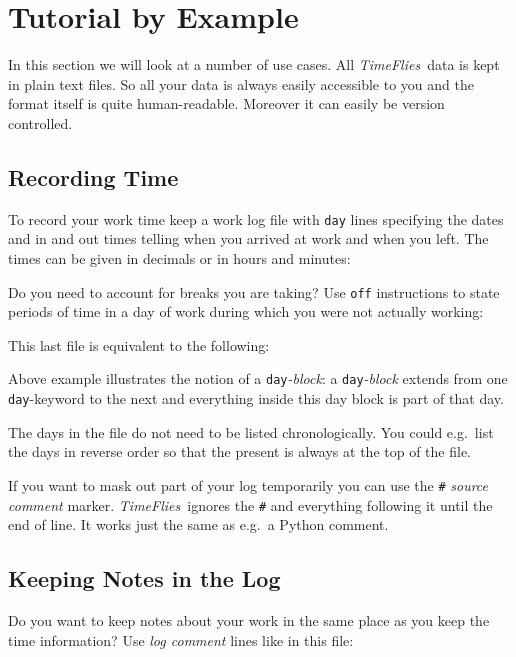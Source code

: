 \documentclass[11pt]{article}
\newcommand{\timeflies}{\emph{TimeFlies}}
\begin{document}
\section{Tutorial by Example}

In this section we will look at a number of use cases. All \timeflies\ data is kept in plain text files. So all your data is always easily accessible to you and the format itself is quite human-readable. Moreover it can easily be version controlled.

\subsection{Recording Time}

To record your work time keep a work log file with \verb-day- lines specifying the dates and in and out times telling when you arrived at work and when you left. The times can be given in decimals or in hours and minutes:



Do you need to account for breaks you are taking? Use \verb-off- instructions to state periods of time in a day of work during which you were not actually working:



This last file is equivalent to the following:



Above example illustrates the notion of a \verb-day-\emph{-block}: a \verb-day-\emph{-block} extends
from one \verb-day--keyword to the next and everything inside this day block is part of that day.

The days in the file do not need to be listed chronologically. You could e.g.\ list the days in reverse order so that the present is always at the top of the file.

If you want to mask out part of your log temporarily you can use the \verb-#- \emph{source comment} marker. \timeflies\ ignores the \verb-#- and everything following it until the end of line. It works just the same as e.g.\ a Python comment.



\subsection{Keeping Notes in the Log}

Do you want to keep notes about your work in the same place as you keep the time information? Use \emph{log comment} lines like in this file:
\end{document}
